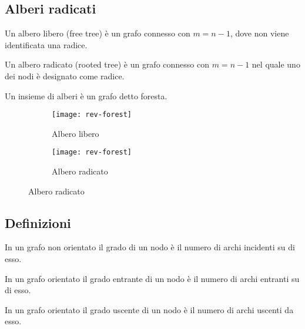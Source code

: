 \subsection*{Alberi radicati}

\begin{definition}
	Un albero libero (free tree) è un grafo connesso con \(m = n-1\), dove non viene identificata una radice.
\end{definition}

\begin{definition}
	Un albero radicato (rooted tree) è un grafo connesso con \(m = n-1\) nel quale uno dei nodi è designato come radice.
\end{definition}

\begin{definition}[Foresta]
	Un insieme di alberi è un grafo detto foresta.
\end{definition}

\begin{figure}[H]
	\begin{subfigure}{.5\textwidth}\centering
		\texttt{[image: rev-forest]}
		\caption{Albero libero}
	\end{subfigure}\hfill
	\begin{subfigure}{.5\textwidth}\centering
		\texttt{[image: rev-forest]}
		\caption{Albero radicato}
	\end{subfigure}
\end{figure}

\subsection*{Definizioni}

\begin{definition}
	In un grafo non orientato il grado di un nodo è il numero di archi incidenti su di esso.
\end{definition}

\begin{definition}
	In un grafo orientato il grado entrante di un nodo è il numero di archi entranti su di esso.
\end{definition}

\begin{definition}
	In un grafo orientato il grado uscente di un nodo è il numero di archi uscenti da esso.
\end{definition}

